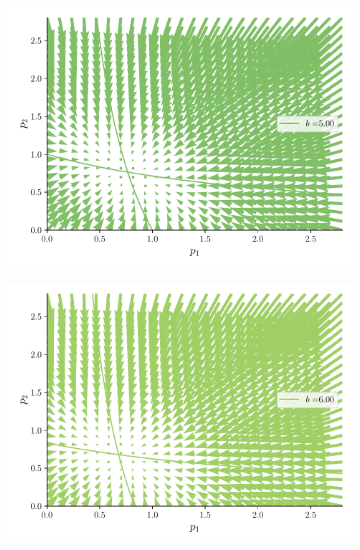 \documentclass[twocolumn,aps,prl]{revtex4-1}
\begin{document}
\begin{figure}[ht!]
\begin{subfigure}[b]{0.49\linewidth}
      \includegraphics[width = 0.999\textwidth]{figuras/ex02-cosa3-4.pdf}
  \end{subfigure}\quad
  \begin{subfigure}[b]{0.49\linewidth}
      \centering
      \includegraphics[width = 0.999\textwidth]{figuras/ex02-cosa3-5.pdf}
  \end{subfigure}\quad
  \begin{subfigure}[b]{0.49\linewidth}
      \centering

\end{subfigure}
\end{figure}
\end{document}
